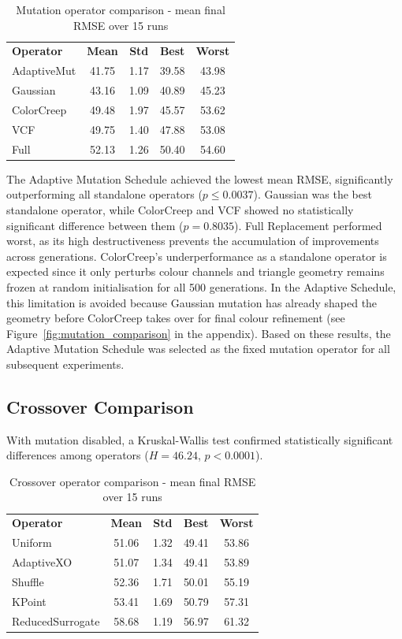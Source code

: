 \documentclass[11pt,a4paper]{article}
\newcommand{\tH}[1]{\textcolor{novagreen}{\textbf{#1}}}
\newcommand{\gmid}{\arrayrulecolor{novagreen}\midrule\arrayrulecolor{black}}
\begin{document}
\begin{table}[h]
\centering
\begin{tabular}{lcccc}
\toprule
\tH{Operator} & \tH{Mean} & \tH{Std} & \tH{Best} & \tH{Worst} \\
\gmid
AdaptiveMut & 41.75 & 1.17 & 39.58 & 43.98 \\
Gaussian    & 43.16 & 1.09 & 40.89 & 45.23 \\
ColorCreep  & 49.48 & 1.97 & 45.57 & 53.62 \\
VCF         & 49.75 & 1.40 & 47.88 & 53.08 \\
Full        & 52.13 & 1.26 & 50.40 & 54.60 \\
\bottomrule
\end{tabular}
\caption{Mutation operator comparison - mean final RMSE over 15 runs}
\end{table}

The Adaptive Mutation Schedule achieved the lowest mean RMSE, significantly
outperforming all standalone operators ($p \leq 0.0037$). Gaussian was the
best standalone operator, while ColorCreep and VCF showed no statistically
significant difference between them ($p = 0.8035$). Full Replacement performed
worst, as its high destructiveness prevents the accumulation of improvements
across generations. ColorCreep's underperformance as a standalone operator is expected since
it only perturbs colour channels and triangle geometry remains frozen at
random initialisation for all 500 generations. In the Adaptive Schedule,
this limitation is avoided because Gaussian mutation has already shaped
the geometry before ColorCreep takes over for final colour refinement
(see Figure~\ref{fig:mutation_comparison} in the appendix).
Based on these results, the Adaptive Mutation Schedule was selected as the
fixed mutation operator for all subsequent experiments.

\subsection{Crossover Comparison}
With mutation disabled, a Kruskal-Wallis test confirmed
statistically significant differences among operators ($H = 46.24$, $p < 0.0001$).

\begin{table}[h]
\centering
\begin{tabular}{lcccc}
\toprule
\tH{Operator} & \tH{Mean} & \tH{Std} & \tH{Best} & \tH{Worst} \\
\gmid
Uniform          & 51.06 & 1.32  & 49.41 & 53.86 \\
AdaptiveXO       & 51.07 & 1.34  & 49.41 & 53.89 \\
Shuffle          & 52.36 & 1.71  & 50.01 & 55.19 \\
KPoint           & 53.41 & 1.69  & 50.79 & 57.31 \\
ReducedSurrogate & 58.68 & 1.19  & 56.97 & 61.32 \\
\bottomrule
\end{tabular}
\caption{Crossover operator comparison - mean final RMSE over 15 runs}
\end{table}
\end{document}
